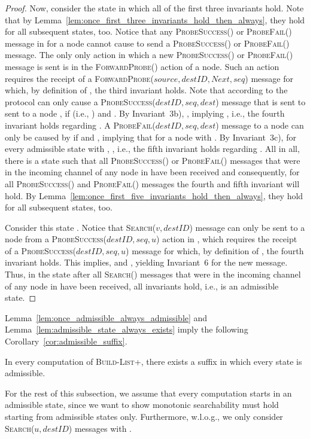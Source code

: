 \documentclass[a4paper,USenglish]{lipics}
\newcommand{\blp}{\textsc{Build-List+}\xspace}
\newcommand{\search}[1]{\textsc{Search(\ensuremath{#1})}\xspace}
\newcommand{\forwardprobe}[1]{\textsc{ForwardProbe(\ensuremath{#1})}\xspace}
\newcommand{\psuccess}[1]{\textsc{ProbeSuccess(\ensuremath{#1})}\xspace}
\newcommand{\pfail}[1]{\textsc{ProbeFail(\ensuremath{#1})}\xspace}
\begin{document}
\begin{proof}
Now, consider the state  in which all of the first three invariants hold.
Note that by Lemma~\ref{lem:once_first_three_invariants_hold_then_always}, they hold for all subsequent states, too.
Notice that any \psuccess{} or \pfail{} message in  for a node  cannot cause  to send a \psuccess{} or \pfail{} message.
The only only action in which a new \psuccess{} or \pfail{} message is sent is in the \forwardprobe{} action of a node.
Such an action requires the receipt of a \forwardprobe{source,destID,Next,seq} message  for which, by definition of , the third invariant holds.
Note that according to the protocol  can only cause a \psuccess{destID,seq,dest} message  that is sent to sent to a node , if  (i.e., ) and .
By Invariant~3b), , implying , i.e., the fourth invariant holds regarding .
A \pfail{destID,seq,dest} message  to a node  can only be caused by  if  and , implying that  for a node  with .
By Invariant~3c), for every admissible state with , , i.e., the fifth invariant holds regarding .
All in all, there is a state  such that all \psuccess{} or \pfail{} messages that were in the incoming channel of any node in  have been received and consequently, for all \psuccess{} and \pfail{} messages the fourth and fifth invariant will hold.
By Lemma~\ref{lem:once_first_five_invariants_hold_then_always}, they hold for all subsequent states, too.

Consider this state .
Notice that \search{v,destID} message can only be sent to a node  from a \psuccess{destID,seq,u} action in , which requires the receipt of a \psuccess{destID,seq,u} message for which, by definition of , the fourth invariant holds.
This implies,  and , yielding Invariant~6 for the new message.
Thus, in the state  after all \search{} messages that were in the incoming channel of any node in  have been received, all invariants hold, i.e.,  is an admissible state.
\end{proof}


Lemma~\ref{lem:once_admissible_always_admissible} and Lemma~\ref{lem:admissible_state_always_exists} imply the following Corollary~\ref{cor:admissible_suffix}.

\begin{corollary}
\label{cor:admissible_suffix}
    In every computation of \blp, there exists a suffix in which every state is admissible. 
\end{corollary}
For the rest of this subsection, we assume that every computation starts in an admissible state, since we want to show monotonic searchability must hold starting from admissible states only.
Furthermore, w.l.o.g., we only consider \search{u,destID} messages with .
\end{document}
